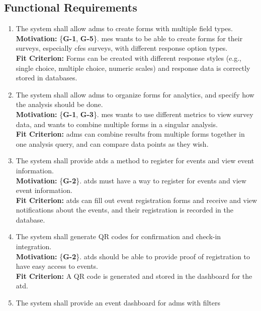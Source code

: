 \documentclass[12pt]{article}
\begin{document}
\subsection{Functional Requirements}
\begin{enumerate}[align=left,
  leftmargin=*,
  labelsep=1em,
  itemindent=0em,
  label=\bfseries FR-\arabic*:,
  ref=\bfseries FR-\arabic*]
  \item \label{FR1} The system shall allow \glspl{adm} to create forms with multiple field types.\\[2mm]
    {\bf Motivation:} \{\textbf{G-1}, \textbf{G-5}\}. \Gls{mes} wants to be able to create forms for their surveys,
    especially \gls{cfes} surveys, with different response option types.\\
    {\bf Fit Criterion:} Forms can be created with different response styles (e.g., single choice, multiple choice,
    numeric scales) and response data is correctly stored in databases.
  \item \label{FR2} The system shall allow \glspl{adm} to organize forms for analytics, and specify how
    the analysis should be done.\\[2mm]
    {\bf Motivation:} \{\textbf{G-1}, \textbf{G-3}\}. \Gls{mes} wants to use different metrics to view survey data,
    and wants to combine multiple forms in a singular analysis.\\
    {\bf Fit Criterion:} \Glspl{adm} can combine results from multiple forms together in one analysis query, and can
    compare data points as they wish.
  \item \label{FR3} The system shall provide \glspl{atd} a method to register for events and view event information.
    \\[2mm]
    {\bf Motivation:} \{\textbf{G-2}\}. \Glspl{atd} must have a way to register for events and view event information.\\
    {\bf Fit Criterion:} \Glspl{atd} can fill out event registration forms and receive and view notifications about
    the events, and their registration is recorded in the database.
  \item \label{FR4} The system shall generate QR codes for confirmation and check-in integration.\\[2mm]
    {\bf Motivation:} \{\textbf{G-2}\}. \Glspl{atd} should be able to provide proof of registration to have easy
    access to events.\\
    {\bf Fit Criterion:} A QR code is generated and stored in the dashboard for the \gls{atd}.
  \item \label{FR5} The system shall provide an event dashboard for \glspl{adm} with filters

\end{enumerate}
\end{document}
